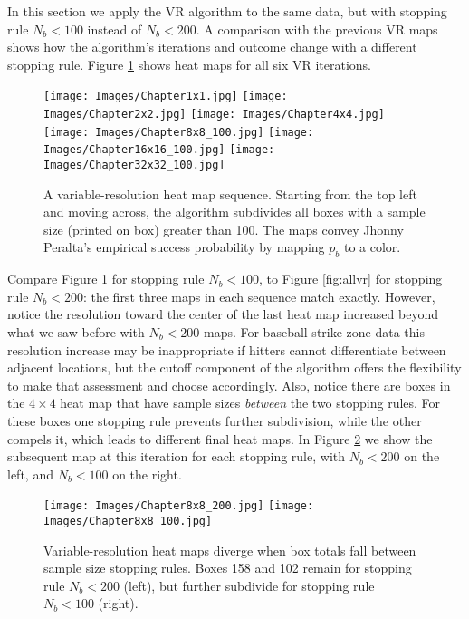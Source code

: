 In this section we apply the VR algorithm to the same data, but with stopping rule $N_{b} < 100$ instead of $N_{b} < 200$. A comparison with the previous VR maps shows how the algorithm's iterations and outcome change with a different stopping rule. Figure \ref{fig:altsr} shows heat maps for all six VR iterations.
        \begin{figure}[H]
      	\centering
      	\texttt{[image: Images/Chapter1x1.jpg]}
      	\texttt{[image: Images/Chapter2x2.jpg]}
      	\texttt{[image: Images/Chapter4x4.jpg]}
      	\texttt{[image: Images/Chapter8x8\_100.jpg]}
      	\texttt{[image: Images/Chapter16x16\_100.jpg]}
      	\texttt{[image: Images/Chapter32x32\_100.jpg]}
      	\caption{A variable-resolution heat map sequence. Starting from the top left and moving across, the algorithm subdivides all boxes with a sample size (printed on box) greater than 100. The maps convey Jhonny Peralta's empirical success probability by mapping $p_{b}$ to a color.}
      	\label{fig:altsr}
\end{figure} 	
Compare Figure \ref{fig:altsr} for stopping rule $N_{b} < 100$, to Figure \ref{fig:allvr} for stopping rule $N_{b} < 200$: the first three maps in each sequence match exactly. However, notice the resolution toward the center of the last heat map increased beyond what we saw before with $N_{b} < 200$ maps. For baseball strike zone data this resolution increase may be inappropriate if hitters cannot differentiate between adjacent locations, but the cutoff component of the algorithm offers the flexibility to make that assessment and choose accordingly. Also, notice there are boxes in the $4 \times 4$ heat map that have sample sizes {\it between} the two stopping rules. For these boxes one stopping rule prevents further subdivision, while the other compels it, which leads to different final heat maps. In Figure \ref{fig:vrcomp} we show the subsequent map at this iteration for each stopping rule, with $N_{b} < 200$ on the left, and $N_{b} < 100$ on the right.
        \begin{figure}[H]
      	\centering      
      	\texttt{[image: Images/Chapter8x8\_200.jpg]}
      	\texttt{[image: Images/Chapter8x8\_100.jpg]}
      	\caption{Variable-resolution heat maps diverge when box totals fall between sample size stopping rules. Boxes 158 and 102 remain for stopping rule $N_{b} < 200$ (left), but further subdivide for stopping rule $N_{b} < 100$ (right).}
      	\label{fig:vrcomp}
\end{figure} 
